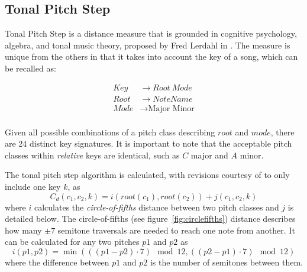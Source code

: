 \subsection{Tonal Pitch Step}

Tonal Pitch Step is a distance measure that is grounded in cognitive psychology, algebra, and tonal music theory, proposed by Fred Lerdahl in \cite{lerdahl1988tonal}. The measure is unique from the others in that it takes into account the key of a song, which can be recalled as:

\begin{align*}
Key &\to Root\ Mode \\
Root &\to NoteName \\
Mode &\to \text{Major Minor} \\
\end{align*}

Given all possible combinations of a pitch class describing $root$ and $mode$, there are 24 distinct key signatures. It is important to note that the acceptable pitch classes within \textit{relative} keys are identical, such as $C$ major and $A$ minor.

The tonal pitch step algorithm is calculated, with revisions courtesy of \cite{de2008tonal} to only include one key $k$, as \[ C_d(c_1, c_2, k) = i(root(c_1), root(c_2)) + j(c_1, c_2, k) \] where $i$ calculates the \textit{circle-of-fifths} distance between two pitch classes and $j$ is detailed below. The circle-of-fifths (see figure~\ref{fig:circlefifths}) distance describes how many $\pm7$ semitone traversals are needed to reach one note from another. It can be calculated for any two pitches $p1$ and $p2$ as \[i({p1}, {p2}) = \min((({p1} - {p2}) \cdot 7) \mod 12, (({p2} - {p1}) \cdot 7) \mod 12)\] where the difference between ${p1}$ and ${p2}$ is the number of semitones between them.
